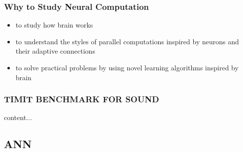 \documentclass{beamer}
\begin{document}
\begin{frame}[plain]
\hspace*{-3pt}
\end{frame}


\begin{frame}\frametitle{Why to Study Neural Computation}
	\begin{itemize}
		\item to study how brain works
		\item to understand the styles of parallel computations inspired by neurons and their adaptive connections
		\item to solve practical problems by using novel learning algorithms inspired by brain
	\end{itemize}
\end{frame}



\begin{frame}\frametitle{TIMIT BENCHMARK FOR SOUND}
	content...
\end{frame}



\subsection{ANN}
\end{document}
